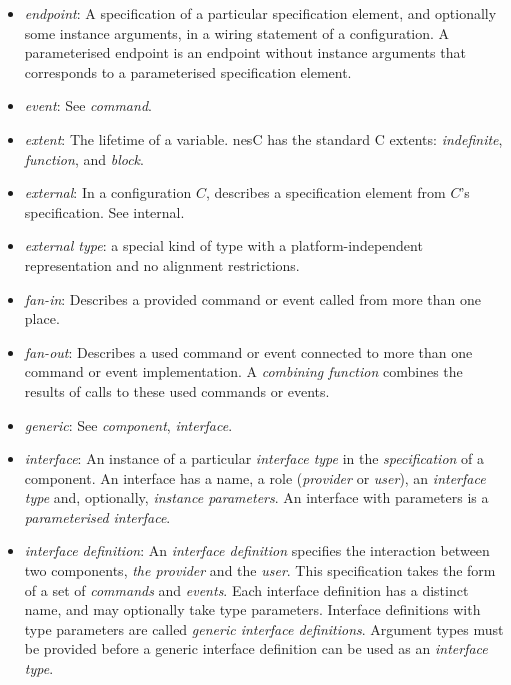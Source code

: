 \documentclass[11pt,letterpaper]{article}
\newcommand{\nesc}{nesC\xspace}
\begin{document}
\begin{itemize}
\item \emph{endpoint}: A specification of a particular specification
element, and optionally some instance arguments, in a wiring
statement of a configuration. A parameterised endpoint is an endpoint
without instance arguments that corresponds to a parameterised specification
element.

\item \emph{event}: See \emph{command}.

\item \emph{extent}: The lifetime of a variable. \nesc has the standard C
extents: \emph{indefinite}, \emph{function}, and \emph{block}.

\item \emph{external}: In a configuration $C$, describes a specification
element from $C$'s specification. See internal.

\item \emph{external type}: a special kind of type with a
platform-independent representation and no alignment restrictions.

\item \emph{fan-in}: Describes a provided command or event called from more
than one place.

\item \emph{fan-out}: Describes a used command or event connected to more
than one command or event implementation. A \emph{combining function}
combines the results of calls to these used commands or events.

\item \emph{generic}: See \emph{component}, \emph{interface}.

\item \emph{interface}: An instance of a particular \emph{interface type}
in the \emph{specification} of a component. An interface has a name, a role
(\emph{provider} or \emph{user}), an \emph{interface type} and, optionally,
\emph{instance parameters}. An interface with parameters is a
\emph{parameterised interface}.

\item \emph{interface definition}: An \emph{interface definition} specifies
the interaction between two components, \emph{the provider} and the
\emph{user}. This specification takes the form of a set of \emph{commands}
and \emph{events}. Each interface definition has a distinct name, and may
optionally take type parameters. Interface definitions with type parameters
are called \emph{generic interface definitions}. Argument types must be
provided before a generic interface definition can be used as an 
\emph{interface type}.


\end{itemize}
\end{document}
